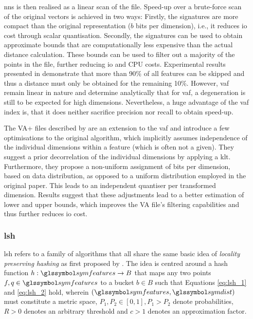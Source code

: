 \acrshort{nns} is then realised as a linear scan of the file. Speed-up over a brute-force scan of the original vectors is achieved in two ways: Firstly, the signatures are more compact than the original representation ($b$ bits per dimension), i.e., it reduces \acrshort{io} cost through scalar quantisation. Secondly, the signatures can be used to obtain approximate bounds that are computationally less expensive than the actual distance calculation. These bounds can be used to filter out a majority of the points in the file, further reducing \acrshort{io} and CPU costs. Experimental results presented in \cite{Weber:1998Va} demonstrate that more than 90\% of all features can be skipped and thus a distance must only be obtained for the remaining 10\%. However, \acrshort{vaf} remain linear in nature and \cite{Echihabi:2021High} determine analytically that for \acrshort{vaf}, a degeneration is still to be expected for high dimensions. Nevertheless, a huge advantage of the \acrshort{vaf} index is, that it does neither sacrifice precision nor recall to obtain speed-up.

The VA+ files described by \cite{Ferhatosmanoglu:2000Vector} are an extension to the \acrshort{vaf} and introduce a few optimisations to the original algorithm, which implicitly assumes independence of the individual dimensions within a feature (which is often not a given). They suggest a prior decorrelation of the individual dimensions by applying a \acrfull{klt}. Furthermore, they propose a non-uniform assignment of bits per dimension, based on data distribution, as opposed to a uniform distribution employed in the original paper. This leads to an independent quantiser per transformed dimension. Results suggest that these adjustments lead to a better estimation of lower and upper bounds, which improves the VA file's filtering capabilities and thus further reduces \acrshort{io} cost.

\subsubsection{\texorpdfstring{\acrfull{lsh}}{Locality Sensitive Hashing (LSH)}}

\acrshort{lsh} refers to a family of algorithms \cite{Echihabi:2021High,Wang:2017ASurvey} that all share the same basic idea of \emph{locality preserving hashing} as first proposed by \cite{Indyk1998:Approximate}. The idea is centred around a hash function $h: \symfeatures \rightarrow B$ that maps any two points $f,q \in \symfeatures$ to a bucket $b \in B$ such that Equations \ref{eq:lsh_1} and \ref{eq:lsh_2} hold, wherein $(\symfeatures, \symdist)$ must constitute a metric space, $P_1, P_2 \in [0, 1], P_1 > P_2$ denote probabilities, $R > 0$ denotes an arbitrary threshold and $c > 1$ denotes an approximation factor.

